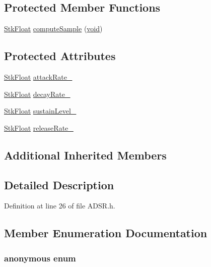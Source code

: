 \subsection*{Protected Member Functions}
\begin{DoxyCompactItemize}
\item 
\hyperlink{namespace_nyq_a044fa20a706520a617bbbf458a7db7e4}{Stk\+Float} \hyperlink{class_nyq_1_1_a_d_s_r_a4e38085475269698221540fffa347dbb}{compute\+Sample} (\hyperlink{sound_8c_ae35f5844602719cf66324f4de2a658b3}{void})
\end{DoxyCompactItemize}
\subsection*{Protected Attributes}
\begin{DoxyCompactItemize}
\item 
\hyperlink{namespace_nyq_a044fa20a706520a617bbbf458a7db7e4}{Stk\+Float} \hyperlink{class_nyq_1_1_a_d_s_r_a7af76373c380b54757e5b1a818362289}{attack\+Rate\+\_\+}
\item 
\hyperlink{namespace_nyq_a044fa20a706520a617bbbf458a7db7e4}{Stk\+Float} \hyperlink{class_nyq_1_1_a_d_s_r_a27534e216f2f4337688dfb7105119485}{decay\+Rate\+\_\+}
\item 
\hyperlink{namespace_nyq_a044fa20a706520a617bbbf458a7db7e4}{Stk\+Float} \hyperlink{class_nyq_1_1_a_d_s_r_aaf88673c1a570c209c6eff11c5b8adbb}{sustain\+Level\+\_\+}
\item 
\hyperlink{namespace_nyq_a044fa20a706520a617bbbf458a7db7e4}{Stk\+Float} \hyperlink{class_nyq_1_1_a_d_s_r_a224b06adedecf54779cbf4e8bc1426c2}{release\+Rate\+\_\+}
\end{DoxyCompactItemize}
\subsection*{Additional Inherited Members}


\subsection{Detailed Description}


Definition at line 26 of file A\+D\+S\+R.\+h.



\subsection{Member Enumeration Documentation}
\subsubsection[{\texorpdfstring{anonymous enum}{anonymous enum}}]{\setlength{\rightskip}{0pt plus 5cm}anonymous enum}\hypertarget{class_nyq_1_1_a_d_s_r_ab800aaf78adb724e9df53dbbb3080fcc}{}\label{class_nyq_1_1_a_d_s_r_ab800aaf78adb724e9df53dbbb3080fcc}


